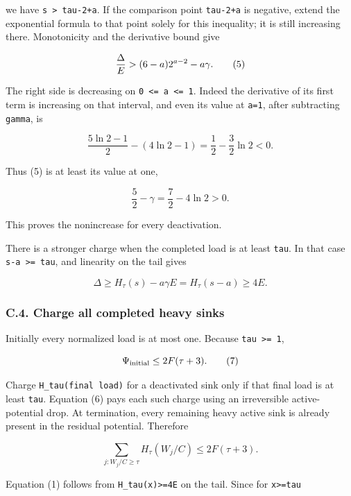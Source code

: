 we have \texttt{s\ \textgreater{}\ tau-2+a}. If the comparison point \texttt{tau-2+a} is negative, extend the exponential formula to that point solely for this inequality; it is still increasing there. Monotonicity and the derivative bound give

\[
{\Delta\over E}
> (6-a)2^{a-2}-a\gamma.                           \tag{5}
\]

The right side is decreasing on \texttt{0\ \textless{}=\ a\ \textless{}=\ 1}. Indeed the derivative of its first term is increasing on that interval, and even its value at \texttt{a=1}, after subtracting \texttt{gamma}, is

\[
\frac{5\ln2-1}{2}-(4\ln2-1)=\frac12-\frac32\ln2<0.
\]

Thus (5) is at least its value at one,

\[
\frac52-\gamma=\frac72-4\ln2>0.
\]

This proves the nonincrease for every deactivation.

There is a stronger charge when the completed load is at least \texttt{tau}. In that case \texttt{s-a\ \textgreater{}=\ tau}, and linearity on the tail gives

\[
\Delta\ge H_\tau(s)-a\gamma E
         =H_\tau(s-a)\ge4E.                       \tag{6}
\]

\hypertarget{af-385fd70686-c.4.-charge-all-completed-heavy-sinks}{%
\subsubsection{C.4. Charge all completed heavy sinks}\label{af-385fd70686-c.4.-charge-all-completed-heavy-sinks}}

Initially every normalized load is at most one. Because \texttt{tau\ \textgreater{}=\ 1},

\[
\Psi_{\rm initial}\le2F(\tau+3).                 \tag{7}
\]

Charge \texttt{H\_tau(final\ load)} for a deactivated sink only if that final load is at least \texttt{tau}. Equation (6) pays each such charge using an irreversible active-potential drop. At termination, every remaining heavy active sink is already present in the residual potential. Therefore

\[
\sum_{j:W_j/C\ge\tau}H_\tau(W_j/C)
\le 2F(\tau+3).                                  \tag{8}
\]

Equation (1) follows from \texttt{H\_tau(x)\textgreater{}=4E} on the tail. Since for \texttt{x\textgreater{}=tau}

